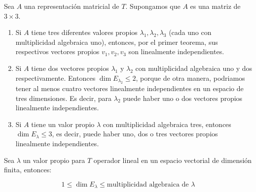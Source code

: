 		\begin{proposicion}
			Sea $A$ una representación matricial de $T$. Supongamos que $A$ es una matriz de $3 \times 3$.

			\begin{enumerate}
				\item Si $A$ tiene tres diferentes valores propios $\lambda_1, \lambda_2, \lambda_3$ (cada uno con multiplicidad algebraica uno), entonces, por el primer teorema, sus respectivos vectores propios $v_1, v_2, v_3$ son linealmente independientes.
				\item Si $A$ tiene dos vectores propios $\lambda_1$ y $\lambda_2$ con multiplicidad algebraica uno y dos respectivamente.
				Entonces $\dim{E_{\lambda_2}} \leq 2$, porque de otra manera, podriamos tener al menos cuatro vectores linealmente independientes en un espacio de tres dimensiones.
				Es decir, para $\lambda_2$ puede haber uno o dos vectores propios linealmente independientes.
				\item Si $A$ tiene un valor propio $\lambda$ con multiplicidad algebraica tres, entonces $\dim{E_{\lambda}} \leq 3$, es decir, puede haber uno, dos o tres vectores propios linealmente independientes.
			\end{enumerate}
		\end{proposicion}

		\begin{teorema}
			Sea $\lambda$ un valor propio para $T$ operador lineal en un espacio vectorial de dimensión finita, entonces:

			\begin{equation}
				1 \leq \dim{E_{\lambda}} \leq \text{multiplicidad algebraica de } \lambda
			\end{equation}
		\end{teorema}

